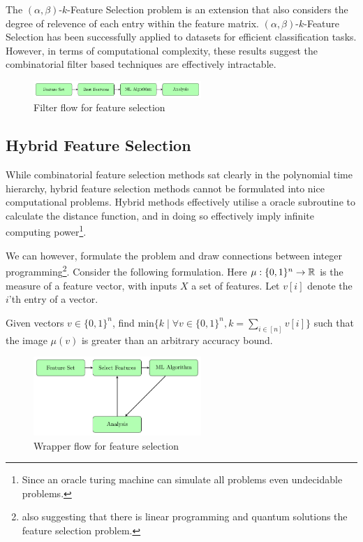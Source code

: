 \documentclass[conference]{IEEEtran}
\begin{document}
The $(\alpha,\beta)$-$k$-Feature Selection problem is an extension that also considers the degree of relevence of each entry within the feature matrix. $(\alpha,\beta)$-$k$-Feature Selection has been successfully applied to datasets for efficient classification tasks\cite{MathiesonEtAl2017,NaeniSalehipour2021,RochadePaulaEtAl2016}. However, in terms of computational complexity, these results suggest the combinatorial filter based techniques are effectively intractable.

\begin{figure}[h]
	\begin{center}
		\includegraphics[width=2.5in]{filter-flow.pdf}
		\caption{Filter flow for feature selection}\label{fig:feat-filter-flow}
	\end{center}
\end{figure}

\subsection{Hybrid Feature Selection}

While combinatorial feature selection methods sat clearly in the polynomial time hierarchy, hybrid feature selection methods cannot be formulated into nice computational problems. Hybrid methods effectively utilise a oracle subroutine to calculate the distance function, and in doing so effectively imply infinite computing power\footnote{Since an oracle turing machine can simulate all problems even undecidable problems.}.

We can however, formulate the problem and draw connections between integer programming\footnote{also suggesting that there is linear programming and quantum solutions the feature selection problem.}. Consider the following formulation. Here $\mu : \{ 0, 1 \}^{n} \to \mathbb{R}$ is the measure of a feature vector, with inputs $X$ a set of features. Let $v[i]$ denote the $i$'th entry of a vector.

\begin{definition}
	Given vectors $v\in \{0,1\}^{n}$, find $\text{min}\{ k \mid \forall v\in \{0,1\}^{n}, k=\sum_{i\in[n]} v[i] \}$ such that the image $\mu(v)$ is greater than an arbitrary accuracy bound.
\end{definition}

\begin{figure}[h]
	\begin{center}
		\includegraphics[width=2.5in]{wrapper-flow.pdf}
		\caption{Wrapper flow for feature selection}\label{fig:feat-wrapper-flow}
	\end{center}
\end{figure}
\end{document}
